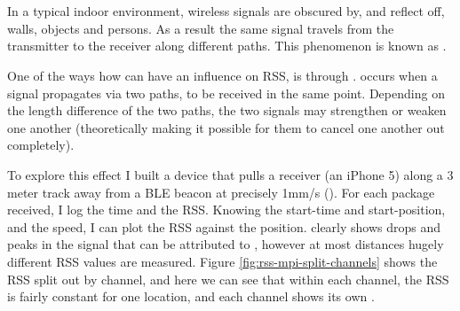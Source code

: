 \section{\Mpi}
\label{sec:rss-mpi}
In a typical indoor environment, wireless signals are obscured by, and reflect off, walls, objects and persons.
As a result the same signal travels from the transmitter to the receiver along different paths.
This phenomenon is known as \mpp.


\begin{figure}[p]
\end{figure}

\begin{figure}[p]
\end{figure}


One of the ways how \mpp can have an influence on RSS, is through \mpi.
\Mpi occurs when a signal propagates via two paths, to be received in the same point.
Depending on the length difference of the two paths, the two signals may strengthen or weaken one another (theoretically making it possible for them to cancel one another out completely).

To explore this effect I built a device that pulls a receiver (an iPhone 5) along a 3 meter track away from a BLE beacon at precisely 1mm/s ().
For each package received, I log the time and the RSS.
Knowing the start-time and start-position, and the speed, I can plot the RSS against the position.
 clearly shows drops and peaks in the signal that can be attributed to \mpi, however at most distances hugely different RSS values are measured.
Figure \ref{fig:rss-mpi-split-channels} shows the RSS split out by channel, and here we can see that within each channel, the RSS is fairly constant for one location, and each channel shows its own \mpids.

